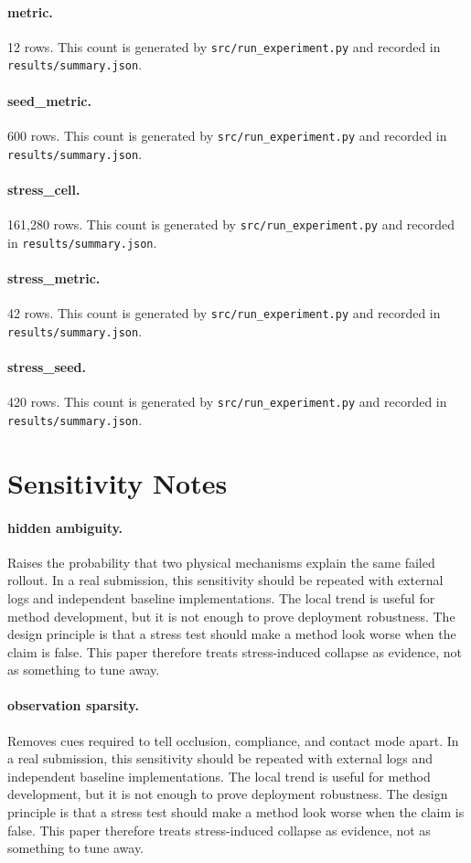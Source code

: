 \documentclass{article}
\begin{document}
\paragraph{metric.} 12 rows. This count is generated by \texttt{src/run\_experiment.py} and recorded in \texttt{results/summary.json}.
\paragraph{seed\_metric.} 600 rows. This count is generated by \texttt{src/run\_experiment.py} and recorded in \texttt{results/summary.json}.
\paragraph{stress\_cell.} 161,280 rows. This count is generated by \texttt{src/run\_experiment.py} and recorded in \texttt{results/summary.json}.
\paragraph{stress\_metric.} 42 rows. This count is generated by \texttt{src/run\_experiment.py} and recorded in \texttt{results/summary.json}.
\paragraph{stress\_seed.} 420 rows. This count is generated by \texttt{src/run\_experiment.py} and recorded in \texttt{results/summary.json}.
\clearpage
\section{Sensitivity Notes}
\paragraph{hidden ambiguity.} Raises the probability that two physical mechanisms explain the same failed rollout. In a real submission, this sensitivity should be repeated with external logs and independent baseline implementations. The local trend is useful for method development, but it is not enough to prove deployment robustness.
The design principle is that a stress test should make a method look worse when the claim is false. This paper therefore treats stress-induced collapse as evidence, not as something to tune away.
\paragraph{observation sparsity.} Removes cues required to tell occlusion, compliance, and contact mode apart. In a real submission, this sensitivity should be repeated with external logs and independent baseline implementations. The local trend is useful for method development, but it is not enough to prove deployment robustness.
The design principle is that a stress test should make a method look worse when the claim is false. This paper therefore treats stress-induced collapse as evidence, not as something to tune away.
\end{document}
